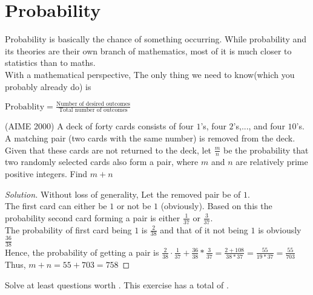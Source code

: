 \section{Probability}
Probability is basically the chance of something occurring. While probability and its theories are their own branch of mathematics, most of it is much closer to statistics than to maths. \\
With a mathematical perspective, The only thing we need to know(which you probably already do) is
\begin{theorem}
    $\text{Probablity} = \frac{\text{Number of desired outcomes}}{\text{Total number of outcomes}}$
\end{theorem}
\begin{example}
    (AIME 2000) A deck of forty cards consists of four $1$’s, four $2$’s,..., and four $10$’s. A matching pair (two cards with the same number) is removed from the deck. Given that these cards are not returned to the deck, let $\frac{m}{n}$ be the probability that two randomly selected cards also form a pair, where $m$ and $n$ are relatively prime positive integers. Find $m + n$
\end{example}
\begin{proof}
    [Solution]
    Without loss of generality, Let the removed pair be of $1$.\\
    The first card can either be $1$ or not be $1$ (obviously). Based on this the probability second card forming a pair is either $\frac{1}{37}$ or $\frac{3}{37}$.\\
    The probability of first card being $1$ is $\frac{2}{38}$ and that of it not being $1$ is obviously $\frac{36}{38}$\\
    Hence, the probability of getting a pair is $\frac{2}{38}\cdot\frac{1}{37}+\frac{36}{38}*\frac{3}{37}=\frac{2+108}{38*37}=\frac{55}{19*37}=\frac{55}{703}$\\
    Thus, $m+n=55+703=758$
\end{proof}
Solve at least questions worth . This exercise has a total of .
